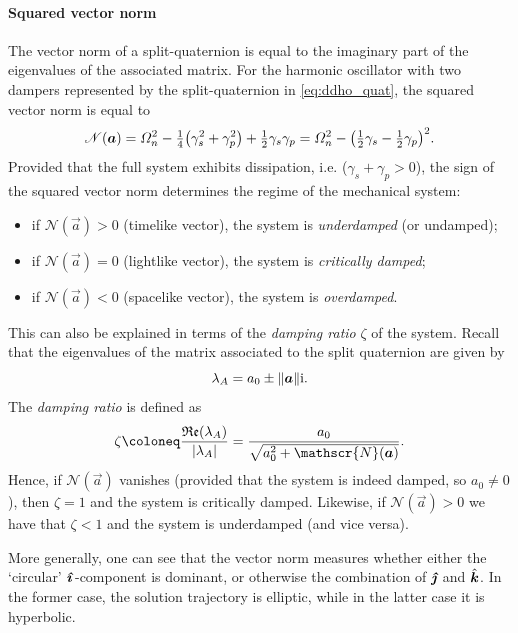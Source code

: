 \paragraph{Squared vector norm}
The vector norm of a split-quaternion is equal to the imaginary part of the eigenvalues of the associated matrix. For the harmonic oscillator with two dampers represented by the split-quaternion in \cref{eq:ddho_quat}, the squared vector norm is equal to 
\begin{equation}
    \mathscr{N}(\vec{a}) = \Omega^2_n - \tfrac{1}{4}\qty(\gamma_s^2 + \gamma_p^2) + \tfrac{1}{2}\gamma_s \gamma_p = \Omega^2_n - \qty(\tfrac{1}{2}\gamma_s - \tfrac{1}{2}\gamma_p)^2.
\end{equation}
Provided that the full system exhibits dissipation, i.e. (\(\gamma_s + \gamma_p > 0\)), the sign of the squared vector norm determines the regime of the mechanical system:
\begin{itemize}
    \item if \(\mathscr{N}(\vec{a}) > 0\) (timelike vector), the system is \emph{underdamped} (or undamped); 
    \item if \(\mathscr{N}(\vec{a}) = 0\) (lightlike vector), the system is \emph{critically damped}; 
    \item if \(\mathscr{N}(\vec{a}) < 0\) (spacelike vector), the system is \emph{overdamped}.
\end{itemize}
This can also be explained in terms of the \emph{damping ratio} \(\zeta\) of the system. Recall that the eigenvalues of the matrix associated to the split quaternion are given by
\begin{equation}
    \lambda_A = a_0 \pm \norm{\vec{a}}\ii.
\end{equation}
The \emph{damping ratio} is defined as
\begin{equation}
    \zeta \coloneq \frac{\Re(\lambda_A)}{\abs{\lambda_A}} = \frac{a_0}{\sqrt{a_0^2 + \mathscr{N}(\vec{a})}}.
\end{equation}
Hence, if \(\mathscr{N}(\vec{a})\) vanishes (provided that the system is indeed damped, so \(a_0 \neq 0\)), then \(\zeta = 1\) and the system is critically damped. Likewise, if \(\mathscr{N}(\vec{a}) > 0\) we have that \(\zeta < 1\) and the system is underdamped (and vice versa).

More generally, one can see that the vector norm measures whether either the `circular' \(\quati\)-component is dominant, or otherwise the combination of \(\quatj\) and \(\quatk\). In the former case, the solution trajectory is elliptic, while in the latter case it is hyperbolic.

